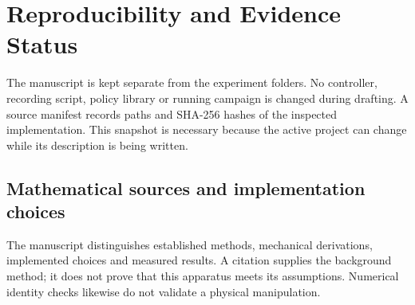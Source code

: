 \chapter{Reproducibility and Evidence Status}
\label{app:reproducibility}

The manuscript is kept separate from the experiment folders. No controller, recording script, policy library or running campaign is changed during drafting. A source manifest records paths and SHA-256 hashes of the inspected implementation. This snapshot is necessary because the active project can change while its description is being written.

\section{Mathematical sources and implementation choices}

The manuscript distinguishes established methods, mechanical derivations, implemented choices and measured results. A citation supplies the background method; it does not prove that this apparatus meets its assumptions. Numerical identity checks likewise do not validate a physical manipulation.

